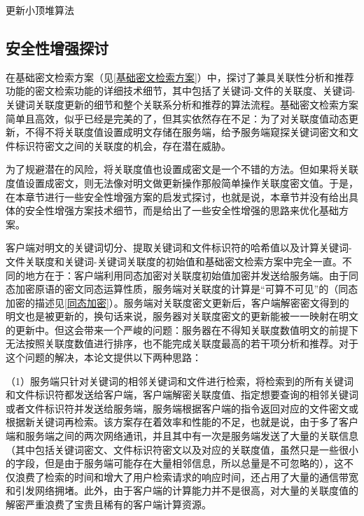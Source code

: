 \documentclass[promaster]{thesis-uestc}
\begin{document}
\begin{algorithm}[H]
    \caption{更新小顶堆算法}
    \label{更新小顶堆算法}
\end{algorithm}

\subsection{安全性增强探讨}\label{安全性增强方案}
在基础密文检索方案（见\ref{基础密文检索方案}）中，探讨了兼具关联性分析和推荐功能的密文检索功能的详细技术细节，其中包括了关键词-文件的关联度、关键词-关键词关联度更新的细节和整个关联系分析和推荐的算法流程。基础密文检索方案简单且高效，似乎已经是完美的了，但其实依然存在不足：为了对关联度值动态更新，不得不将关联度值设置成明文存储在服务端，给予服务端窥探关键词密文和文件标识符密文之间的关联度的机会，存在潜在威胁。

为了规避潜在的风险，将关联度值也设置成密文是一个不错的方法。但如果将关联度值设置成密文，则无法像对明文做更新操作那般简单操作关联度密文值。于是，在本章节进行一些安全性增强方案的启发式探讨，也就是说，本章节并没有给出具体的安全性增强方案技术细节，而是给出了一些安全性增强的思路来优化基础方案。

客户端对明文的关键词切分、提取关键词和文件标识符的哈希值以及计算关键词-文件关联度和关键词-关键词关联度的初始值和基础密文检索方案中完全一直。不同的地方在于：客户端利用同态加密对关联度初始值加密并发送给服务端。由于同态加密原语的密文同态运算性质，服务端对关联度的计算是“可算不可见”的（同态加密的描述见\ref{同态加密}）。服务端对关联度密文更新后，客户端解密密文得到的明文也是被更新的，换句话来说，服务器对关联度密文的更新能被一一映射在明文的更新中。但这会带来一个严峻的问题：服务器在不得知关联度数值明文的前提下无法按照关联度数值进行排序，也不能完成关联度最高的若干项分析和推荐。对于这个问题的解决，本论文提供以下两种思路：

（1）服务端只针对关键词的相邻关键词和文件进行检索，将检索到的所有关键词和文件标识符都发送给客户端，客户端解密关联度值、指定想要查询的相邻关键词或者文件标识符并发送给服务端，服务端根据客户端的指令返回对应的文件密文或根据新关键词再检索。该方案存在着效率和性能的不足，也就是说，由于多了客户端和服务端之间的两次网络通讯，并且其中有一次是服务端发送了大量的关联信息（其中包括关键词密文、文件标识符密文以及对应的关联度值，虽然只是一些很小的字段，但是由于服务端可能存在大量相邻信息，所以总量是不可忽略的），这不仅浪费了检索的时间和增大了用户检索请求的响应时间，还占用了大量的通信带宽和引发网络拥堵。此外，由于客户端的计算能力并不是很高，对大量的关联度值的解密严重浪费了宝贵且稀有的客户端计算资源。
\end{document}
